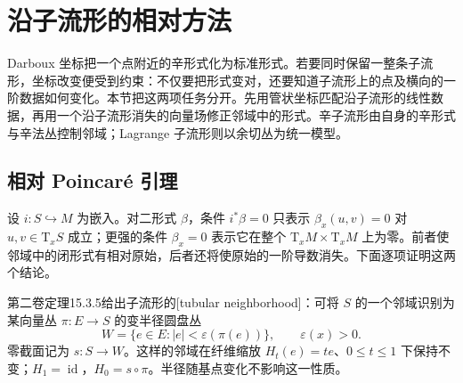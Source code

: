 
% 
% 

\section{沿子流形的相对方法}
\label{g4:sec:0803}

Darboux 坐标把一个点附近的辛形式化为标准形式。若要同时保留一整条子流形，坐标改变便受到约束：不仅要把形式变对，还要知道子流形上的点及横向的一阶数据如何变化。本节把这两项任务分开。先用管状坐标匹配沿子流形的线性数据，再用一个沿子流形消失的向量场修正邻域中的形式。辛子流形由自身的辛形式与辛法丛控制邻域；Lagrange 子流形则以余切丛为统一模型。

\subsection{相对 Poincaré 引理}
\label{g4:subsec:0803:01}

设 \(i:S\hookrightarrow M\) 为嵌入。对二形式 \(\beta\)，条件 \(i^*\beta=0\) 只表示 \(\beta_x(u,v)=0\) 对 \(u,v\in\mathrm{T}_xS\) 成立；更强的条件 \(\beta_x=0\) 表示它在整个 \(\mathrm{T}_xM\times\mathrm{T}_xM\) 上为零。前者使邻域中的闭形式有相对原始，后者还将使原始的一阶导数消失。下面逐项证明这两个结论。

\ProseParagraphBreak

第二卷定理15.3.5给出子流形的[tubular neighborhood]：可将 \(S\) 的一个邻域识别为某向量丛 \(\pi:E\to S\) 的变半径圆盘丛
\[
	W=\{e\in E:|e|<\varepsilon(\pi(e))\},\qquad \varepsilon(x)>0.
\]
零截面记为 \(s:S\to W\)。这样的邻域在纤维缩放 \(H_t(e)=te\)、\(0\le t\le1\) 下保持不变；\(H_1=\operatorname{id}\)，\(H_0=s\circ\pi\)。半径随基点变化不影响这一性质。

